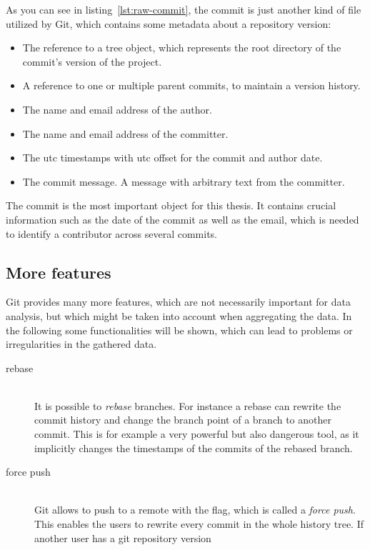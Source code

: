 As you can see in listing~\ref{lst:raw-commit}, the commit is just another kind of file utilized by Git, which contains some metadata about a repository version:

\begin{itemize}
    \item The reference to a tree object, which represents the root directory of the commit's version of the project.
    \item A reference to one or multiple parent commits, to maintain a version history.
    \item The name and email address of the author.
    \item The name and email address of the committer.
    \item The \ac{utc} timestamps with \ac{utc} offset for the commit and author date.
    \item The commit message. A message with arbitrary text from the committer.
\end{itemize}

The commit is the most important object for this thesis.
It contains crucial information such as the date of the commit as well as the email, which is needed to identify a contributor across several commits.


\subsection{More features}

Git provides many more features, which are not necessarily important for data analysis, but which might be taken into account when aggregating the data.
In the following some functionalities will be shown, which can lead to problems or irregularities in the gathered data.

\begin{description}
    \item[rebase] \hfill \\
        It is possible to \emph{rebase} branches. For instance a rebase can rewrite the commit history and change the branch point of a branch to another commit.
        This is for example a very powerful but also dangerous tool, as it implicitly changes the timestamps of the commits of the rebased branch.

    \item[force push] \hfill \\
        Git allows to push to a remote with the  flag, which is called a \emph{force push}.
        This enables the users to rewrite every commit in the whole history tree. If another user has a git repository version
\end{description}
